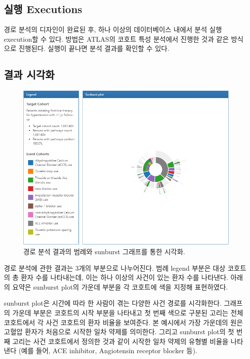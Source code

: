 \documentclass[10.5pt]{book}
\theoremstyle{definition}
\theoremstyle{definition}
\theoremstyle{definition}
\theoremstyle{remark}
\begin{document}
\subsection{실행 Executions}\label{-executions}

경로 분석의 디자인이 완료된 후, 하나 이상의 데이터베이스 내에서 분석
실행 execution할 수 있다. 방법은 ATLAS의 코호트 특성 분석에서 진행한
것과 같은 방식으로 진행된다. 실행이 끝나면 분석 결과를 확인할 수 있다.

\subsection{결과 시각화}\label{-}

\begin{figure}

{\centering \includegraphics[width=1\linewidth]{images/Characterization/atlasPathwaysResults} 

}

\caption{경로 분석 결과의 범례와 sunburst 그래프를 통한 시각화.}\label{fig:atlasPathwaysResults}
\end{figure}

경로 분석에 관한 결과는 3개의 부분으로 나누어진다. 범례 legend 부분은
대상 코호트의 총 환자 수를 나타내는데, 이는 하나 이상의 사건이 있는 환자
수를 나타낸다. 아래의 요약은 sunburst plot의 가운데 부분을 각 코호트에
색을 지정해 표현하였다.

sunburst plot은 시간에 따라 한 사람이 겪는 다양한 사건 경로를
시각화한다. 그래프의 가운데 부분은 코호트의 시작 부분을 나타내고 첫 번째
색으로 구분된 고리는 전체 코호트에서 각 사건 코호트의 환자 비율을
보여준다. 본 예시에서 가장 가운데의 원은 고혈압 환자가 처음으로 시작한
일차 약제를 의미한다. 그리고 sunburst plot의 첫 번째 고리는 사건
코호트에서 정의한 것과 같이 시작한 일차 약제의 유형별 비율을 나타낸다
(예를 들어, ACE inhibitor, Angiotensin receptor blocker 등).
\end{document}
